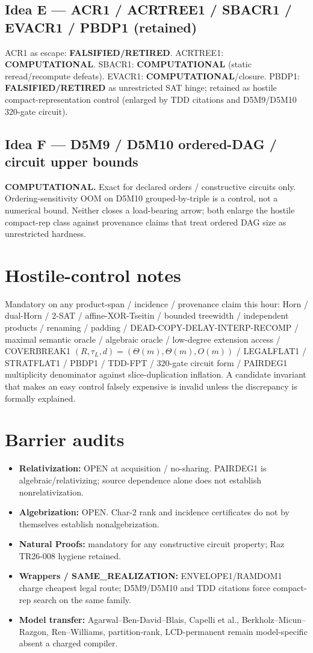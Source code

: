 \documentclass[11pt]{article}
\begin{document}
\subsection*{Idea E --- ACR1 / ACRTREE1 / SBACR1 / EVACR1 / PBDP1 (retained)}
ACR1 as escape: \textbf{FALSIFIED/RETIRED}.
ACRTREE1: \textbf{COMPUTATIONAL}.
SBACR1: \textbf{COMPUTATIONAL} (static reread/recompute defeats).
EVACR1: \textbf{COMPUTATIONAL}/closure.
PBDP1: \textbf{FALSIFIED/RETIRED} as unrestricted SAT hinge; retained as hostile
compact-representation control (enlarged by TDD citations and D5M9/D5M10
$320$-gate circuit).

\subsection*{Idea F --- D5M9 / D5M10 ordered-DAG / circuit upper bounds}
\textbf{COMPUTATIONAL.} Exact for declared orders / constructive circuits only.
Ordering-sensitivity OOM on D5M10 grouped-by-triple is a control, not a numerical
bound. Neither closes a load-bearing arrow; both enlarge the hostile compact-rep
class against provenance claims that treat ordered DAG size as unrestricted
hardness.

\section*{Hostile-control notes}
Mandatory on any product-span / incidence / provenance claim this hour:
Horn / dual-Horn / 2-SAT / affine-XOR-Tseitin / bounded treewidth /
independent products / renaming / padding / DEAD-COPY-DELAY-INTERP-RECOMP /
maximal semantic oracle / algebraic oracle / low-degree extension access /
COVERBREAK1 $(R,\tau_L,d)=(\Theta(m),\Theta(m),O(m))$ /
LEGALFLAT1 / STRATFLAT1 / PBDP1 / TDD-FPT / $320$-gate circuit form /
PAIRDEG1 multiplicity denominator against slice-duplication inflation.
A candidate invariant that makes an easy control falsely expensive is invalid
unless the discrepancy is formally explained.

\section*{Barrier audits}
\begin{itemize}
\item \textbf{Relativization:} OPEN at acquisition / no-sharing. PAIRDEG1 is
algebraic/relativizing; source dependence alone does not establish
nonrelativization.
\item \textbf{Algebrization:} OPEN. Char-$2$ rank and incidence certificates do
not by themselves establish nonalgebrization.
\item \textbf{Natural Proofs:} mandatory for any constructive circuit property;
Raz TR26-008 hygiene retained.
\item \textbf{Wrappers / SAME\_REALIZATION:} ENVELOPE1/RAMDOM1 charge cheapest
legal route; D5M9/D5M10 and TDD citations force compact-rep search on the same
family.
\item \textbf{Model transfer:} Agarwal--Ben-David--Blais, Capelli et al.,
Berkholz--Micun--Razgon, Ren--Williams, partition-rank, LCD-permanent remain
model-specific absent a charged compiler.
\end{itemize}
\end{document}
